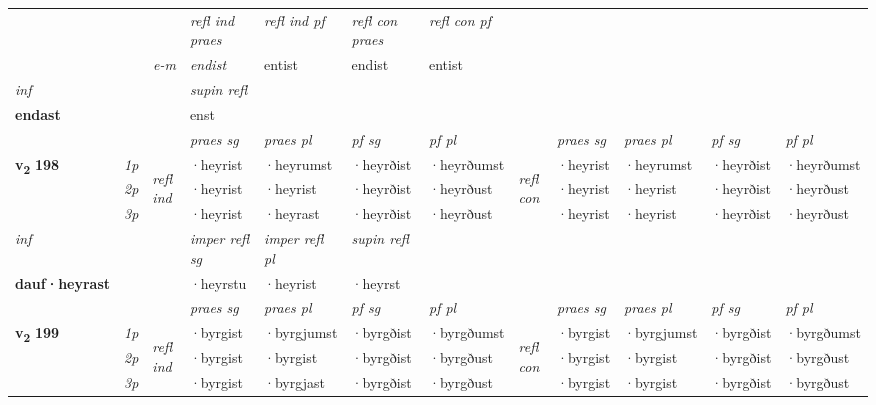 \begin{longtable}[l]{X>{\footnotesize\itshape}llXXXXlXXXX}
 & && \textit{refl ind praes} & \textit{refl ind pf} & \textit{refl con praes} & \textit{refl con pf} \\*
\multicolumn{3}{r}{\textit{e-m}}& endist & entist & endist & entist \\*

\cmidrule{4-7}
   {\textit{inf}} & &       & \textit{supin refl}  \\*
  {\textbf{endast}} & &       & enst  \\*

\midrule

 & &   & \textit{praes sg}  & \textit{praes pl}    & \textit{ pf sg} & \textit{pf pl} & & \textit{praes sg}  & \textit{praes pl}    & \textit{pf sg} & \textit{pf pl }  \\ \cmidrule{4-7} \cmidrule{9-12}
 \multirow{2}{*}{{{\textbf{v{\textsubscript{2}}} \Large{\textbf{198}}}}}  & 1p & \multirow{3}{*}{\begin{turn}{90}\textit{refl ind}\end{turn}}  & ·heyrist & ·heyrumst & ·heyrðist & ·heyrðumst & \multirow{3}{*}{\begin{turn}{90}\textit{refl con}\end{turn}}  &·heyrist & ·heyrumst & ·heyrðist & ·heyrðumst \\*
 & 2p &  & ·heyrist & ·heyrist & ·heyrðist & ·heyrðust & &·heyrist & ·heyrist & ·heyrðist & ·heyrðust \\*
 & 3p  & & ·heyrist & ·heyrast & ·heyrðist & ·heyrðust & & ·heyrist & ·heyrist& ·heyrðist & ·heyrðust \\*
\cmidrule{4-7} \cmidrule{9-12}

   {\textit{inf}} & &   & \textit{imper refl sg} & \textit{imper refl pl}   & \textit{supin refl}  \\*
  {\textbf{dauf\allowbreak ·heyrast}} & &   & ·heyrstu & ·heyrist   & ·heyrst  \\*

\midrule

 & &   & \textit{praes sg}  & \textit{praes pl}    & \textit{ pf sg} & \textit{pf pl} & & \textit{praes sg}  & \textit{praes pl}    & \textit{pf sg} & \textit{pf pl }  \\ \cmidrule{4-7} \cmidrule{9-12}
 \multirow{2}{*}{{{\textbf{v{\textsubscript{2}}} \Large{\textbf{199}}}}}  & 1p & \multirow{3}{*}{\begin{turn}{90}\textit{refl ind}\end{turn}}  & ·byrgist & ·byrgjumst & ·byrgðist & ·byrgðumst & \multirow{3}{*}{\begin{turn}{90}\textit{refl con}\end{turn}}  &·byrgist & ·byrgjumst & ·byrgðist & ·byrgðumst \\*
 & 2p &  & ·byrgist & ·byrgist & ·byrgðist & ·byrgðust & &·byrgist & ·byrgist & ·byrgðist & ·byrgðust \\*
 & 3p  & & ·byrgist & ·byrgjast & ·byrgðist & ·byrgðust & & ·byrgist & ·byrgist& ·byrgðist & ·byrgðust \\*
\cmidrule{4-7} \cmidrule{9-12}


\end{longtable}
